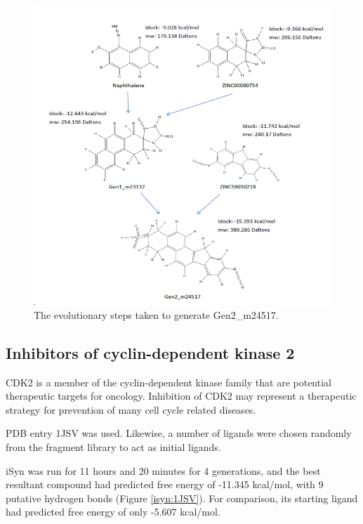 \begin{figure}
\begin{center}
\includegraphics[width=\linewidth]{../isyn/Gen2_m24517.png}
\end{center}
\caption{The evolutionary steps taken to generate Gen2\_m24517.}
\label{isyn:Gen2_m24517}
\end{figure}

\subsection{Inhibitors of cyclin-dependent kinase 2}

CDK2 is a member of the cyclin-dependent kinase family that are potential therapeutic targets for oncology. Inhibition of CDK2 may represent a therapeutic strategy for prevention of many cell cycle related diseases.

PDB entry 1JSV was used. Likewise, a number of ligands were chosen randomly from the fragment library to act as initial ligands.

iSyn was run for 11 hours and 20 minutes for 4 generations, and the best resultant compound had predicted free energy of -11.345 kcal/mol, with 9 putative hydrogen bonds (Figure \ref{isyn:1JSV}). For comparison, its starting ligand had predicted free energy of only -5.607 kcal/mol.

